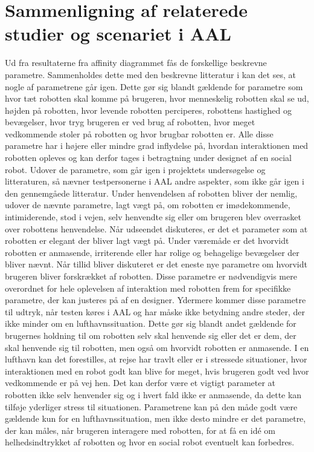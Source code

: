 \section{Sammenligning af relaterede studier og scenariet i AAL}
\label{ParametreTidligereStudier}
%
Ud fra resultaterne fra affinity diagrammet fås de forskellige beskrevne parametre. Sammenholdes dette med den beskrevne litteratur i  kan det ses, at nogle af parametrene går igen. Dette gør sig blandt gældende for parametre som hvor tæt robotten skal komme på brugeren, hvor menneskelig robotten skal se ud, højden på robotten, hvor levende robotten perciperes, robottens hastighed og bevægelser, hvor tryg brugeren er ved brug af robotten, hvor meget vedkommende stoler på robotten og hvor brugbar robotten er. Alle disse parametre har i højere eller mindre grad inflydelse på, hvordan interaktionen med robotten opleves og kan derfor tages i betragtning under designet af en social robot. \blankline
%
Udover de parametre, som går igen i projektets undersøgelse og litteraturen, så nævner testpersonerne i AAL andre aspekter, som ikke går igen i den gennemgåede litteratur. Under henvendelsen af robotten bliver der nemlig, udover de nævnte parametre, lagt vægt på, om robotten er imødekommende, intimiderende, stod i vejen, selv henvendte sig eller om brugeren blev overrasket over robottens henvendelse. Når udseendet diskuteres, er det et parameter som at robotten er elegant der bliver lagt vægt på. Under væremåde er det hvorvidt robotten er anmasende, irriterende eller har rolige og behagelige bevægelser der bliver nævnt. Når tillid bliver diskuteret er det eneste nye parametre om hvorvidt brugeren bliver forskrækket af robotten. Disse parametre er nødvendigvis mere overordnet for hele oplevelsen af interaktion med robotten frem for specifikke parametre, der kan justeres på af en designer. Ydermere kommer disse parametre til udtryk, når testen køres i AAL og har måske ikke betydning andre steder, der ikke minder om en lufthavnssituation. Dette gør sig blandt andet gældende for brugernes holdning til om robotten selv skal henvende sig eller det er dem, der skal henvende sig til robotten, men også om hvorvidt robotten er anmasende. I en lufthavn kan det forestilles, at rejse har travlt eller er i stressede situationer, hvor interaktionen med en robot godt kan blive for meget, hvis brugeren godt ved hvor vedkommende er på vej hen. Det kan derfor være et vigtigt parameter at robotten ikke selv henvender sig og i hvert fald ikke er anmasende, da dette kan tilføje yderliger stress til situationen. Parametrene kan på den måde godt være gældende kun for en lufthavnssituation, men ikke desto mindre er det parametre, der kan måles, når brugeren interagere med robotten, for at få en idé om helhedsindtrykket af robotten og hvor en social robot eventuelt kan forbedres. \blankline
